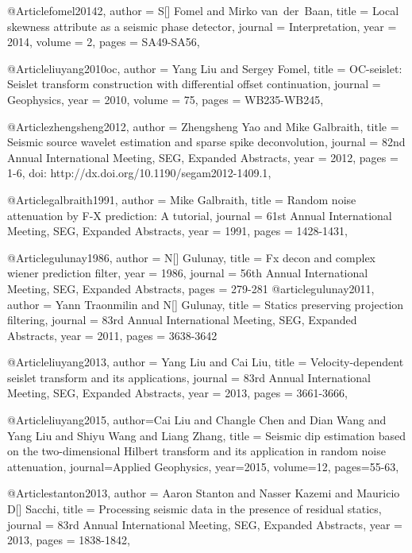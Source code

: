 @Article{fomel20142,
  author = 	 {S[] Fomel and Mirko van~der~Baan},
  title = 	 {Local skewness attribute as a seismic phase detector},
  journal = 	 {Interpretation},
  year = 	 2014,
  volume =	 2,
  pages =	 {SA49-SA56},
}

@Article{liuyang2010oc,
  author = 	 {Yang Liu and Sergey Fomel},
  title = 	 {OC-seislet: Seislet transform construction with differential offset continuation},
  journal = 	 {Geophysics},
  year = 	 2010,
  volume =	 75,
  pages =	 {WB235-WB245},
}

@Article{zhengsheng2012,
  author = 	 {Zhengsheng Yao and Mike Galbraith},
  title = 	 {Seismic source wavelet estimation and sparse spike deconvolution},
  journal = 	 {82nd Annual International Meeting, SEG, Expanded Abstracts},
  year = 	 2012,
  pages =	 {1-6, doi: http://dx.doi.org/10.1190/segam2012-1409.1},
}

@Article{galbraith1991,
  author = 	 {Mike Galbraith},
  title = 	 {Random noise attenuation by {F}-{X} prediction: A tutorial},
  journal = 	 {61st Annual International Meeting, SEG, Expanded Abstracts},
  year = 	 1991,
  pages =	 {1428-1431},
}

@Article{gulunay1986,
  author =	 {N[] Gulunay},
  title = 	 {Fx decon and complex wiener prediction filter},
  year = 	 {1986},
  journal = 	 {56th Annual International Meeting, SEG, Expanded Abstracts},  
  pages =        {279-281}
}
@article{gulunay2011,
  author =	 {Yann Traonmilin and N[] Gulunay},
  title = 	 {Statics preserving projection filtering},
  journal =    {83rd Annual International Meeting, SEG, Expanded Abstracts},
  year = 	 {2011},
  pages =        {3638-3642}
}

@Article{liuyang2013,
  author = 	 {Yang Liu and Cai Liu},
  title = 	 {Velocity-dependent seislet transform and its applications},
  journal = 	 {83rd Annual International Meeting, SEG, Expanded Abstracts},
  year = 	 2013,
  pages =	 {3661-3666},
}

@Article{liuyang2015,
  author={Cai Liu and Changle Chen and Dian Wang and Yang Liu and Shiyu Wang and Liang Zhang},
  title = {Seismic dip estimation based on the two-dimensional Hilbert transform and its application in random noise attenuation},
  journal={Applied Geophysics},
  year=2015,
  volume=12,
  pages={55-63},
}

@Article{stanton2013,
  author = 	 {Aaron Stanton and Nasser Kazemi and Mauricio D[] Sacchi},
  title = 	 {Processing seismic data in the presence of residual statics},
  journal = 	 {83rd Annual International Meeting, SEG, Expanded Abstracts},
  year = 	 2013,
  pages =	 {1838-1842},
}

